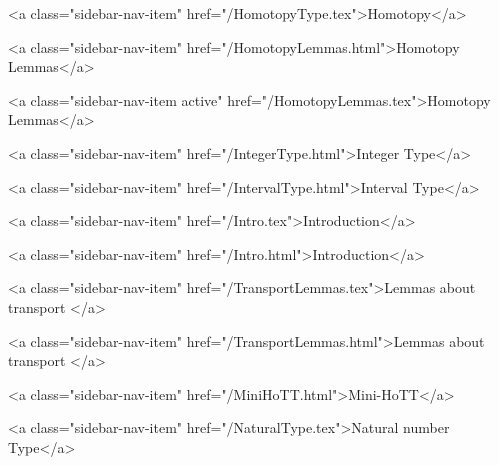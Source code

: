       
    
      
        
          <a class="sidebar-nav-item" href="/HomotopyType.tex">Homotopy</a>
        
      
    
      
        
          <a class="sidebar-nav-item" href="/HomotopyLemmas.html">Homotopy Lemmas</a>
        
      
    
      
        
          <a class="sidebar-nav-item active" href="/HomotopyLemmas.tex">Homotopy Lemmas</a>
        
      
    
      
        
          <a class="sidebar-nav-item" href="/IntegerType.html">Integer Type</a>
        
      
    
      
        
          <a class="sidebar-nav-item" href="/IntervalType.html">Interval Type</a>
        
      
    
      
        
          <a class="sidebar-nav-item" href="/Intro.tex">Introduction</a>
        
      
    
      
        
          <a class="sidebar-nav-item" href="/Intro.html">Introduction</a>
        
      
    
      
        
          <a class="sidebar-nav-item" href="/TransportLemmas.tex">Lemmas about transport </a>
        
      
    
      
        
          <a class="sidebar-nav-item" href="/TransportLemmas.html">Lemmas about transport </a>
        
      
    
      
        
          <a class="sidebar-nav-item" href="/MiniHoTT.html">Mini-HoTT</a>
        
      
    
      
        
          <a class="sidebar-nav-item" href="/NaturalType.tex">Natural number Type</a>
        
